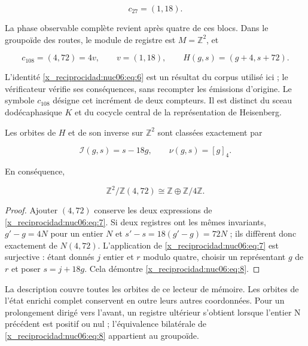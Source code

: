 \[
c_{27}=(1,18).
\]

La phase observable complète revient après quatre de ces blocs. Dans le groupoïde des routes, le module de registre est \(M=\mathbb Z^2\), et

\begin{equation}
c_{108}=(4,72)=4v,\qquad v=(1,18),\qquad
H(g,s)=(g+4,s+72).
\label{x_reciprocidad:nuc06:eq:6}
\end{equation}

L’identité \eqref{x_reciprocidad:nuc06:eq:6} est un résultat du corpus utilisé ici ; le vérificateur vérifie ses conséquences, sans recompter les émissions d’origine. Le symbole \(c_{108}\) désigne cet incrément de deux compteurs. Il est distinct du sceau dodécaphasique \(K\) et du cocycle central de la représentation de Heisenberg.

\begin{theorem}

Les orbites de \(H\) et de son inverse sur \(\mathbb Z^2\) sont classées exactement par

\begin{equation}
\boxed{\quad \mathcal I(g,s)=s-18g,\qquad \nu(g,s)=[g]_4.\quad}
\label{x_reciprocidad:nuc06:eq:7}
\end{equation}

En conséquence,

\begin{equation}
\mathbb Z^2/\mathbb Z(4,72)\cong\mathbb Z\oplus\mathbb Z/4\mathbb Z.
\label{x_reciprocidad:nuc06:eq:8}
\end{equation}
\end{theorem}

\begin{proof}
Ajouter \((4,72)\) conserve les deux expressions de \eqref{x_reciprocidad:nuc06:eq:7}. Si deux registres ont les mêmes invariants, \(g'-g=4N\) pour un entier \(N\) et \(s'-s=18(g'-g)=72N\) ; ils diffèrent donc exactement de \(N(4,72)\). L’application de \eqref{x_reciprocidad:nuc06:eq:7} est surjective : étant donnés \(j\) entier et \(r\) modulo quatre, choisir un représentant \(g\) de \(r\) et poser \(s=j+18g\). Cela démontre \eqref{x_reciprocidad:nuc06:eq:8}.
\end{proof}

La description couvre toutes les orbites de ce lecteur de mémoire. Les orbites de l’état enrichi complet conservent en outre leurs autres coordonnées. Pour un prolongement dirigé vers l’avant, un registre ultérieur s’obtient lorsque l’entier N précédent est positif ou nul ; l’équivalence bilatérale de \eqref{x_reciprocidad:nuc06:eq:8} appartient au groupoïde.

